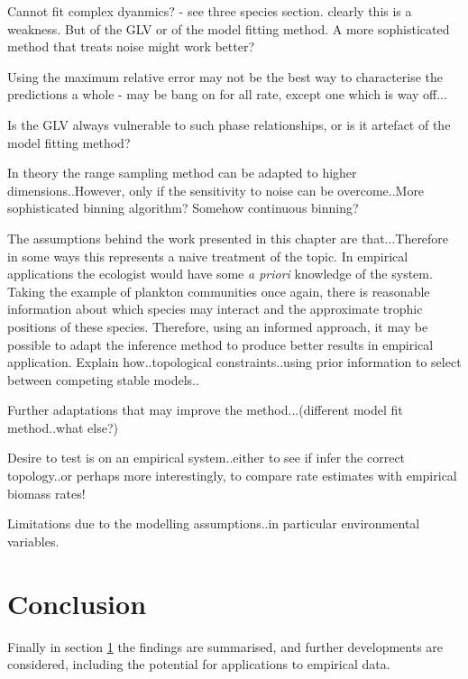 Cannot fit complex dyanmics? - see three species section. clearly this is a weakness. But of the GLV or of the model fitting method. A more sophisticated method that treats noise might work better?

Using the maximum relative error may not be the best way to characterise the predictions a whole - may be bang on for all rate, except one which is way off...

Is the GLV always vulnerable to such phase relationships, or is it artefact of the model fitting method?

In theory the range sampling method can be adapted to higher dimensions..However, only if the sensitivity to noise can be overcome..More sophisticated binning algorithm? Somehow continuous binning?

The assumptions behind the work presented in this chapter are that...Therefore in some ways this represents a naive treatment of the topic. In empirical applications the ecologist would have some \emph{a priori} knowledge of the system. Taking the example of plankton communities once again, there is reasonable information about which species may interact and the approximate trophic positions of these species. Therefore, using an informed approach, it may be possible to adapt the inference method to produce better results in empirical application. Explain how..topological constraints..using prior information to select between competing stable models..

Further adaptations that may improve the method...(different model fit method..what else?)

Desire to test is on an empirical system..either to see if infer the correct topology..or perhaps more interestingly, to compare rate estimates with empirical biomass rates!

Limitations due to the modelling assumptions..in particular environmental variables. 

\section{Conclusion}
\label{sec:si_conc}

Finally in section \ref{sec:si_conc} the findings are summarised, and further developments are considered, including the potential for applications to empirical data. 